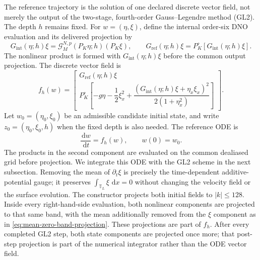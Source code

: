\documentclass[11pt]{article}
\newcommand{\T}{\mathbb T}
\newcommand{\G}{\mathcal G}
\newcommand{\dd}{\,\mathrm d}
\begin{document}
The reference trajectory is the solution of one declared discrete vector
field, not merely the output of the two-stage, fourth-order Gauss--Legendre
method (GL2).  The depth $h$ remains fixed.  For $w=(\eta,\xi)$, define the
internal order-six DNO evaluation and its delivered projection by
\begin{equation}
  G_{\mathrm{int}}(\eta;h)\xi
  =\G^{N,p}_M(P_K\eta;h)(P_K\xi),
  \qquad
  G_{\mathrm{ref}}(\eta;h)\xi
  =P_K^\circ\!\left[G_{\mathrm{int}}(\eta;h)\xi\right].
  \label{eq:internal-and-delivered-dno}
\end{equation}
The nonlinear product is formed with $G_{\mathrm{int}}(\eta;h)\xi$ before
the common output projection.  The discrete vector field is
\begin{equation}
  f_h(w)=
  \begin{bmatrix}
    G_{\mathrm{ref}}(\eta;h)\xi\\[2pt]
    P_K^\circ\!\left[
      -g\eta-\dfrac12\xi_x^2
      +\dfrac{\left(G_{\mathrm{int}}(\eta;h)\xi+\eta_x\xi_x\right)^2}
             {2(1+\eta_x^2)}
    \right]
  \end{bmatrix}.
\end{equation}
Let $w_0=(\eta_0,\xi_0)$ be an admissible candidate initial state, and write
$z_0=(\eta_0,\xi_0,h)$ when the fixed depth is also needed.  The reference
ODE is
\begin{equation}
  \frac{\dd w}{\dd t}=f_h(w),
  \qquad w(0)=w_0.
  \label{eq:reference-flow}
\end{equation}
The products in the second component are evaluated on the common dealiased
grid before projection.
We integrate this ODE with the GL2 scheme in the next subsection.
Removing the mean of $\partial_t\xi$ is precisely the time-dependent additive-potential
gauge; it preserves $\int_{\T_L}\xi\,\dd x=0$ without changing the velocity
field or the surface evolution.
The constructor projects both initial fields to $|k|\leq128$.  Inside every
right-hand-side evaluation, both nonlinear components are projected to that
same band, with the mean additionally removed from the $\xi$ component as in
\eqref{eq:mean-zero-band-projection}.  These projections are part of $f_h$.
After every completed GL2 step, both state components are projected once more;
that post-step projection is part of the numerical integrator rather than the
ODE vector field.
\end{document}
